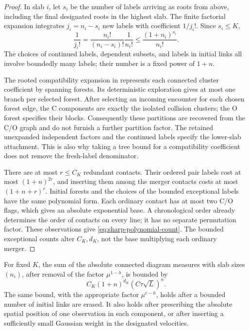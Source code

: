 \begin{proof}
In slab \(i\), let \(s_i\) be the number of labels arriving as roots
from above, including the final designated roots in the highest slab.
The finite factorial expansion integrates \(j_i=n_i-s_i\) new labels
with coefficient \(1/j_i!\).  Since \(s_i\le K\),
\[
 \frac1{j_i!}=\frac{n_i!}{(n_i-s_i)!}\frac1{n_i!}
             \le\frac{(1+n_i)^{s_i}}{n_i!}.
\]
The choices of continued labels, dependent subsets, and labels in
initial links all involve boundedly many labels; their number is a
fixed power of \(1+n\).

The rooted compatibility expansion in 
represents each connected cluster coefficient by spanning forests.
Its deterministic exploration gives at most one branch per selected
forest.  After selecting an incoming encounter for each chosen forest
edge, the C components are exactly the isolated collision clusters;
the O forest specifies their blocks.  Consequently these partitions
are recovered from the C/O graph and do not furnish a further partition
factor.  The retained unexpanded independent factors and the continued
labels specify the lower-slab attachment.  This is also why taking a
tree bound for a compatibility coefficient does not remove the
fresh-label denominator.

There are at most \(r\le C_K\) redundant contacts.  Their ordered pair
labels cost at most \((1+n)^{2r}\), and inserting them among the merger
contacts costs at most \((1+n+r)^r\).  Initial forests and the choices
of the bounded exceptional labels have the same polynomial form.
Each ordinary contact has at most two C/O flags, which gives an
absolute exponential base.  A chronological order already determines
the order of contacts on every line; it has no separate permutation
factor.  These observations give
\eqref{eq:sharp-polynomial-count}.  The bounded exceptional counts
alter \(C_K,d_K\), not the base multiplying each ordinary merger.
\end{proof}

\begin{lemma}\label{lem:sharp-summability}
For fixed \(K\), the sum of the absolute connected diagram measures
with slab sizes \((n_i)\), after removal of the factor
\(\mu^{1-h}\), is bounded by
\begin{equation}\label{eq:sharp-summable}
       C_K(1+n)^{d_K}(C\tau\sqrt L)^n.
\end{equation}
The same bound, with the appropriate factor \(\mu^{c-h}\), holds
after a bounded number of initial links are erased.  It also holds
after prescribing the absolute spatial position of one observation
in each component, or after inserting a sufficiently small Gaussian
weight in the designated velocities.
\end{lemma}

